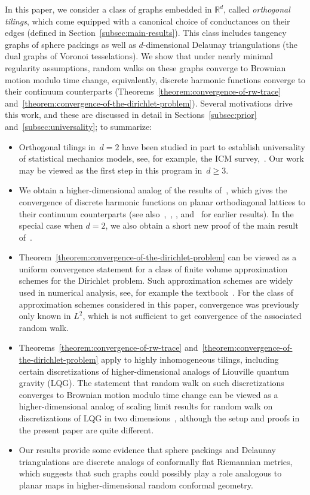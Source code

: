 \documentclass[12pt]{amsart}
\numberwithin{equation}{section}
\newcommand*{\Rd}{\ensuremath{\mathbb{R}^d}}
\begin{document}
In this paper, we consider a class of graphs embedded in $\Rd$, called \emph{orthogonal tilings}, which come equipped with a canonical choice of conductances on their edges (defined in Section~\ref{subsec:main-results}). This class includes tangency graphs of sphere packings as well as $d$-dimensional Delaunay triangulations (the dual graphs of Voronoi tesselations). We show that under nearly minimal regularity assumptions, random walks on these graphs converge to Brownian motion modulo time change, equivalently, discrete harmonic functions converge to their continuum counterparts (Theorems~\ref{theorem:convergence-of-rw-trace} and~\ref{theorem:convergence-of-the-dirichlet-problem}). Several motivations drive this work, and these are discussed in detail in Sections~\ref{subsec:prior} and~\ref{subsec:universality}; to summarize:
\begin{itemize}
\item Orthogonal tilings in~$d=2$ have been studied in part to establish universality of statistical mechanics models, see, for example, the ICM survey,~\cite{smirnovicm}. Our work may be viewed as the first step in this program in~$d \geq 3$. 
\item We obtain a higher-dimensional analog of the results of~\cite{gurel2020dirichlet}, which gives the convergence of discrete harmonic functions on planar orthodiagonal lattices to their continuum counterparts  (see also~\cite{MR1692623},~\cite{chelkaksmirnov}, \cite{skopenkov2013boundary}, and~\cite{werness2015discrete} for earlier results). In the special case when $d=2$, we also obtain a short new proof of the main result of~\cite{gurel2020dirichlet}. 
\item Theorem~\ref{theorem:convergence-of-the-dirichlet-problem} can be viewed as a uniform convergence statement for a class of finite volume approximation schemes for the Dirichlet problem. Such approximation schemes are widely used in numerical analysis, see, for example the textbook~\cite{eymard2000finite}. For the class of approximation schemes considered in this paper, convergence was previously only known in $L^2$, which is not sufficient to get convergence 
of the associated random walk. 
\item Theorems~\ref{theorem:convergence-of-rw-trace} and~\ref{theorem:convergence-of-the-dirichlet-problem} apply to highly inhomogeneous tilings, including certain discretizations of higher-dimensional analogs of Liouville quantum gravity (LQG). The statement that random walk on such discretizations converges to Brownian motion modulo time change can be viewed as a higher-dimensional analog of scaling limit results for random walk on discretizations of LQG in two dimensions~\cite{GMS-Tutte, GMSInvariance}, although the setup and proofs in the present paper are quite different.  
\item Our results provide some evidence that sphere packings and Delaunay triangulations are discrete analogs of conformally flat Riemannian metrics, which suggests that such graphs could possibly play a role analogous to planar maps in higher-dimensional random conformal geometry.  
\end{itemize}
\end{document}
